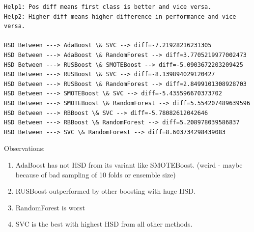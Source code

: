 \documentclass[11pt]{article}
\providecommand{\tightlist}{%
      \setlength{\itemsep}{0pt}\setlength{\parskip}{0pt}}
\begin{document}
    \begin{Verbatim}[commandchars=\\\{\}]
Help1: Pos diff means first class is better and vice versa.
Help2: Higher diff means higher difference in performance and vice versa.

HSD Between ---> AdaBoost \& SVC --> diff=-7.21928216231305
HSD Between ---> AdaBoost \& RandomForest --> diff=3.7705219977002473
HSD Between ---> RUSBoost \& SMOTEBoost --> diff=-5.0903672203209425
HSD Between ---> RUSBoost \& SVC --> diff=-8.139894029120427
HSD Between ---> RUSBoost \& RandomForest --> diff=2.8499101308928703
HSD Between ---> SMOTEBoost \& SVC --> diff=-5.435596670373702
HSD Between ---> SMOTEBoost \& RandomForest --> diff=5.554207489639596
HSD Between ---> RBBoost \& SVC --> diff=-5.78082612042646
HSD Between ---> RBBoost \& RandomForest --> diff=5.208978039586837
HSD Between ---> SVC \& RandomForest --> diff=8.603734298439083

    \end{Verbatim}

    Observations:

\begin{enumerate}
\def\labelenumi{\arabic{enumi}.}
\tightlist
\item
  AdaBoost has not HSD from its variant like SMOTEBoost. (weird - maybe
  because of bad sampling of 10 folds or ensemble size)
\item
  RUSBoost outperformed by other boosting with huge HSD.
\item
  RandomForest is worst
\item
  SVC is the best with highest HSD from all other methods.
\end{enumerate}


    
    
    
    
\end{document}
